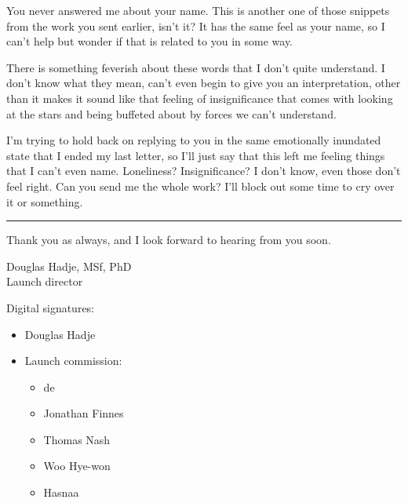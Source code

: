 \noindent You never answered me about your name. This is another one of those snippets from the work you sent earlier, isn't it? It has the same feel as your name, so I can't help but wonder if that is related to you in some way.

There is something feverish about these words that I don't quite understand. I don't know what they mean, can't even begin to give you an interpretation, other than it makes it sound like that feeling of insignificance that comes with looking at the stars and being buffeted about by forces we can't understand.

I'm trying to hold back on replying to you in the same emotionally inundated state that I ended my last letter, so I'll just say that this left me feeling things that I can't even name. Loneliness? Insignificance? I don't know, even those don't feel right. Can you send me the whole work? I'll block out some time to cry over it or something.

\begin{center}\rule{0.5\linewidth}{0.5pt}\end{center}

Thank you as always, and I look forward to hearing from you soon.

Douglas Hadje, MSf, PhD\\
Launch director

Digital signatures:

\begin{itemize}
\tightlist
\item
  Douglas Hadje
\item
  Launch commission:

  \begin{itemize}
  \tightlist
  \item
    de
  \item
    Jonathan Finnes
  \item
    Thomas Nash
  \item
    Woo Hye-won
  \item
    Hasnaa
  \end{itemize}
\end{itemize}
